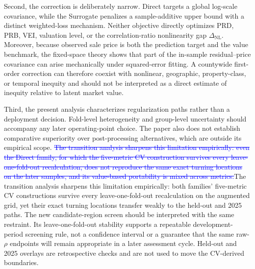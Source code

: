 \documentclass[10pt]{article}
\theoremstyle{definition}
\newcommand{\1}{\mathbf{1}}
\newcommand{\oldtext}[1]{\textcolor{blue}{\sout{#1}}}
\newcommand{\newtext}[1]{\textcolor{impGreen}{#1}}
\newcommand{\latesttext}[1]{\textcolor{latestPurple}{#1}}
\begin{document}
\newtext{Second, the correction is deliberately narrow. Direct targets a global log-scale covariance, while the Surrogate penalizes a sample-additive upper bound with a distinct weighted-loss mechanism. Neither objective directly optimizes PRD, PRB, VEI, valuation level, or the correlation-ratio nonlinearity gap $\Delta_{\mathrm{NL}}$. Moreover, because observed sale price is both the prediction target and the value benchmark, the fixed-space theory shows that part of the in-sample residual--price covariance can arise mechanically under squared-error fitting. A countywide first-order correction can therefore coexist with nonlinear, geographic, property-class, or temporal inequity and should not be interpreted as a direct estimate of inequity relative to latent market value.}

\newtext{Third, the present analysis characterizes regularization paths rather than a deployment decision. Fold-level heterogeneity and group-level uncertainty should accompany any later operating-point choice. The paper also does not establish comparative superiority over post-processing alternatives, which are outside its empirical scope.} \oldtext{The transition analysis sharpens this limitation empirically: even the Direct family, for which the five-metric CV construction survives every leave-one-fold-out recalculation, does not reproduce the same exact turning locations on the later samples, and its value-based portability is mixed across metrics.}\latesttext{The transition analysis sharpens this limitation empirically: both families' five-metric CV constructions survive every leave-one-fold-out recalculation on the augmented grid, yet their exact turning locations transfer weakly to the held-out and 2025 paths.}
\latesttext{The new candidate-region screen should be interpreted with the same restraint. Its leave-one-fold-out stability supports a repeatable development-period screening rule, not a confidence interval or a guarantee that the same raw-$\rho$ endpoints will remain appropriate in a later assessment cycle. Held-out and 2025 overlays are retrospective checks and are not used to move the CV-derived boundaries.}
\end{document}
